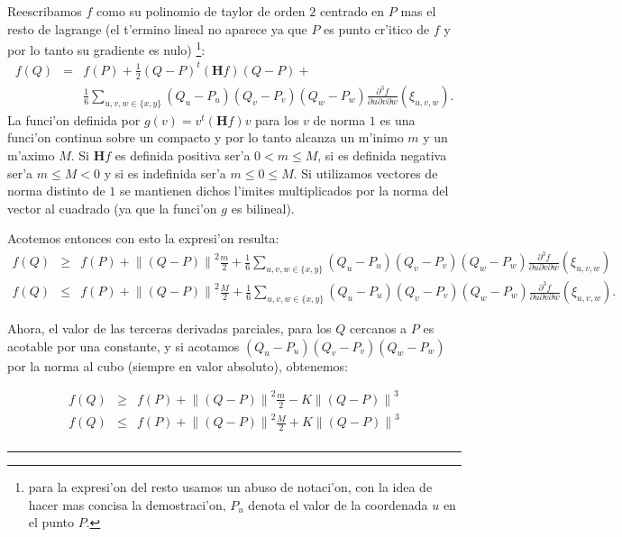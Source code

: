 \documentclass[a4paper,spanish]{article}
\newcommand{\norma}[1]{\left\|#1\right\|}
\newcommand{\parcial}[2]{\frac{\partial #1}{\partial #2}}
\newcommand{\He}[0]{\mathbf{H}}
\newenvironment{demo}{{\noindent \textbf{Demo: }}}{\hfill\rule{2mm}{2mm}\par}
\begin{document}
\begin{enumerate}
\begin{demo}
Reescribamos $f$ como su polinomio de taylor de orden $2$
centrado en $P$ mas el resto de lagrange (el t'ermino lineal no 
aparece ya que $P$ es punto cr'itico de $f$ y por lo tanto su
gradiente es nulo) \footnote{para la expresi'on del resto usamos un abuso de 
notaci'on, con la idea de hacer mas concisa la demostraci'on, $P_u$ denota el
valor de la coordenada $u$ en el punto $P$.}:
\begin{eqnarray}
\label{taylor-f}
f(Q) &=& f(P) + \frac{1}{2} (Q-P)^t (\He f) (Q-P) + \\ 
     & & \frac{1}{6} \sum_{u,v,w \in \{x,y\}} (Q_u-P_u)(Q_v-P_v)(Q_w-P_w)
	\parcial{^3 f}{u \partial v \partial w} (\xi_{u,v,w}).
\end{eqnarray}
La funci'on definida por $g(v) = v^t (\He f) v$ para los $v$ de norma $1$ es
una funci'on continua sobre un compacto y por lo tanto alcanza un m'inimo $m$
y un m'aximo $M$. Si $\He f$ es definida positiva ser'a $0 < m \leq M$, si
es definida negativa ser'a $m \leq M < 0$ y si es indefinida ser'a 
$m \leq 0 \leq M$. Si utilizamos vectores de norma distinto de $1$ se 
mantienen dichos l'imites multiplicados por la norma del vector al cuadrado 
(ya que la funci'on $g$ es bilineal).

Acotemos entonces con esto la expresi'on \label{taylor-f} resulta:
\begin{eqnarray}
f(Q) &\geq& f(P) + \norma{(Q-P)}^2 \frac{m}{2} + 
\frac{1}{6} \sum_{u,v,w \in \{x,y\}} (Q_u-P_u)(Q_v-P_v)(Q_w-P_w)
	\parcial{^3 f}{u \partial v \partial w} (\xi_{u,v,w}) \\
f(Q) &\leq& f(P) + \norma{(Q-P)}^2 \frac{M}{2} + 
\frac{1}{6} \sum_{u,v,w \in \{x,y\}} (Q_u-P_u)(Q_v-P_v)(Q_w-P_w)
	\parcial{^3 f}{u \partial v \partial w} (\xi_{u,v,w}).
\end{eqnarray}

Ahora, el valor de las terceras derivadas parciales, para los $Q$ cercanos a
$P$ es acotable por una constante, y si acotamos $(Q_u-P_u)(Q_v-P_v)(Q_w-P_w)$
por la norma al cubo (siempre en valor absoluto), obtenemos:

\begin{eqnarray}
\label{taylor-acotado-f-min}
f(Q) &\geq& f(P) + \norma{(Q-P)}^2 \frac{m}{2} - 
K \norma{(Q-P)}^3\\
\label{taylor-acotado-f-max}
f(Q) &\leq& f(P) + \norma{(Q-P)}^2 \frac{M}{2} + 
K \norma{(Q-P)}^3\\
\end{eqnarray}


\end{demo}
\end{enumerate}
\end{document}

